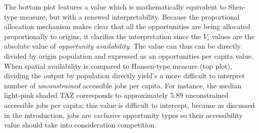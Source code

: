 \documentclass[]{elsarticle} %
\begin{document}
The bottom plot features a value which is mathematically equivalent to
Shen-type measure, but with a renewed interpretability. Because the
proportional allocation mechanism makes clear that all the opportunities
are being allocated proportionally to origins, it clarifies the
interpretation since the \(V_i\) values are the absolute value of
\emph{opportunity availability}. The value can thus can be directly
divided by origin population and expressed as an opportunities per
capita value. When spatial availability is compared to Hansen-type
measure (top plot), dividing the output by population directly yield's a
more difficult to interpret number of \emph{unconstrained} accessible
jobs per capita. For instance, the median light-pink shaded TAZ
corresponds to approximately 5.89 unconstrained accessible jobs per
capita; this value is difficult to intercept, because as discussed in
the introduction, jobs are \emph{exclusive} opportunity types so their
accessibility value should take into consideration competition.
\end{document}
